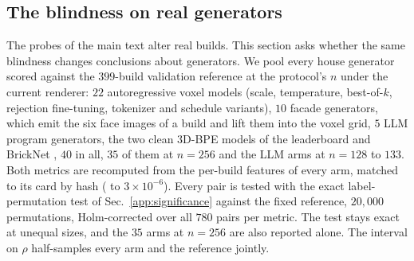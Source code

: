 \subsection{The blindness on real generators}
\label{app:rankflips}

The probes of the main text alter real builds. This section asks whether the same blindness
changes conclusions about generators. We pool every house generator scored against the
$399$-build validation reference at the protocol's $n$ under the current renderer: $22$
autoregressive voxel models (scale, temperature, best-of-$k$, rejection fine-tuning,
tokenizer and schedule variants), $10$ facade generators, which emit the six face images of
a build and lift them into the voxel grid, $5$ LLM program generators, the two clean 3D-BPE
models of the leaderboard and BrickNet \citep{kulits2026bricknet}, $40$ in all, $35$ of them
at $n{=}256$ and the LLM arms at $n{=}128$ to $133$. Both metrics are recomputed from the
per-build features of every arm, matched to its card by hash (\mvkid{} to $3\times10^{-6}$).
Every pair is tested with the exact label-permutation test of Sec.~\ref{app:significance}
against the fixed reference, $20{,}000$ permutations, Holm-corrected over all $780$ pairs per
metric. The test stays exact at unequal sizes, and the $35$ arms at $n{=}256$ are also
reported alone. The interval on $\rho$ half-samples every arm and the reference jointly.

